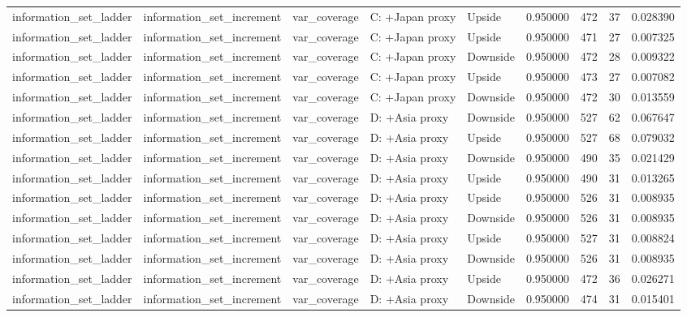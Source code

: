 \begin{tabular}{lllllrrr}
information\_set\_ladder & information\_set\_increment & var\_coverage & C: +Japan proxy & Upside & 0.950000 & 472 & 37 & 0.028390 \\
information\_set\_ladder & information\_set\_increment & var\_coverage & C: +Japan proxy & Upside & 0.950000 & 471 & 27 & 0.007325 \\
information\_set\_ladder & information\_set\_increment & var\_coverage & C: +Japan proxy & Downside & 0.950000 & 472 & 28 & 0.009322 \\
information\_set\_ladder & information\_set\_increment & var\_coverage & C: +Japan proxy & Upside & 0.950000 & 473 & 27 & 0.007082 \\
information\_set\_ladder & information\_set\_increment & var\_coverage & C: +Japan proxy & Downside & 0.950000 & 472 & 30 & 0.013559 \\
information\_set\_ladder & information\_set\_increment & var\_coverage & D: +Asia proxy & Downside & 0.950000 & 527 & 62 & 0.067647 \\
information\_set\_ladder & information\_set\_increment & var\_coverage & D: +Asia proxy & Upside & 0.950000 & 527 & 68 & 0.079032 \\
information\_set\_ladder & information\_set\_increment & var\_coverage & D: +Asia proxy & Downside & 0.950000 & 490 & 35 & 0.021429 \\
information\_set\_ladder & information\_set\_increment & var\_coverage & D: +Asia proxy & Upside & 0.950000 & 490 & 31 & 0.013265 \\
information\_set\_ladder & information\_set\_increment & var\_coverage & D: +Asia proxy & Upside & 0.950000 & 526 & 31 & 0.008935 \\
information\_set\_ladder & information\_set\_increment & var\_coverage & D: +Asia proxy & Downside & 0.950000 & 526 & 31 & 0.008935 \\
information\_set\_ladder & information\_set\_increment & var\_coverage & D: +Asia proxy & Upside & 0.950000 & 527 & 31 & 0.008824 \\
information\_set\_ladder & information\_set\_increment & var\_coverage & D: +Asia proxy & Downside & 0.950000 & 526 & 31 & 0.008935 \\
information\_set\_ladder & information\_set\_increment & var\_coverage & D: +Asia proxy & Upside & 0.950000 & 472 & 36 & 0.026271 \\
information\_set\_ladder & information\_set\_increment & var\_coverage & D: +Asia proxy & Downside & 0.950000 & 474 & 31 & 0.015401 \\

\end{tabular}

